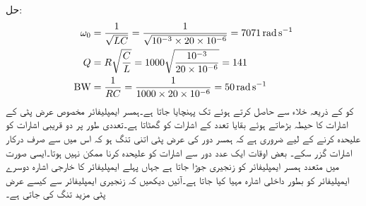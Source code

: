 حل:
\begin{align*}
\omega_0&=\frac{1}{\sqrt{LC}}=\frac{1}{\sqrt{10^{-3}\times 20 \times 10^{-6}}}=\SI{7071}{\radian\per\second}\\
Q&=R\sqrt{\frac{C}{L}}=1000\sqrt{\frac{10^{-3}}{20\times 10^{-6}}}=141\\
{{\textup{BW}}}&=\frac{1}{RC}=\frac{1}{1000\times 20\times 10^{-6}}=\SI{50}{\radian\per\second}
\end{align*}
 کو  کے ذریعہ خلاء سے حاصل کرتے ہوئے  تک پہنچایا جاتا ہے۔ہمسر ایمپلیفائر مخصوص  عرض پٹی کے اشارات کا حیطہ بڑھاتے ہوئے بقایا تعدد کے اشارات کو گھٹاتا ہے۔تعددی طور پر دو قریبی اشارات کو علیحدہ کرنے کے لیے ضروری ہے کہ ہمسر دور کی عرض پٹی اتنی تنگ ہو کہ اس میں سے صرف درکار اشارات گزر سکے۔ بعض اوقات ایک عدد  دور سے اشارات کو علیحدہ کرنا ممکن نہیں ہوتا۔ایسی صورت میں متعدد ہمسر ایمپلیفائر کو زنجیری جوڑا جاتا ہے جہاں پہلے ایمپلیفائر کا خارجی اشارہ دوسرے ایمپلیفائر کو بطور داخلی اشارہ مہیا کیا جاتا ہے۔آئیں دیکھیں کہ زنجیری ایمپلیفائر سے کیسے عرض پٹی مزید تنگ کی جاتی ہے۔

